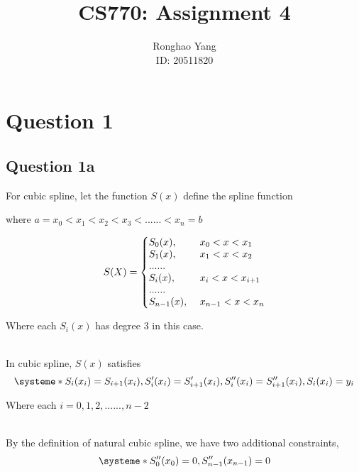 \documentclass[11pt]{article} %
\title{CS770: Assignment 4}
\author{Ronghao Yang\\ID: 20511820}
\begin{document}
\maketitle

\section{Question 1}
\subsection{Question 1a}
For cubic spline, let the function $S(x)$ define the spline function\\\medskip
\centerline{where $a = x_{0} < x_{1} < x_{2} < x_{3} < ......< x_{n} = b$}
 
\begin{equation}
  S(X)=\left\{
  \begin{array}{@{}ll@{}}
    S_{0}(x), & \text{}\ x_{0}<x<x_{1} \\
    S_{1}(x), & \text{}\ x_{1}<x<x_{2}\\
    ......\\
    S_{i}(x), & \text{} \ x_{i}<x<x_{i+1}\\
    ......\\
    S_{n-1}(x), & \text{}\ x_{n-1}<x<x_{n}
  \end{array}\right.
\end{equation} 
\centerline{Where each $S_{i}(x)$ has degree 3 in this case.}\\
In cubic spline, $S(x)$ satisfies
\[
\systeme*{
S_{i}(x_{i})=S_{i+1}(x_{i}),
S_{i}'(x_{i})=S_{i+1}'(x_{i}), 
S_{i}''(x_{i})=S_{i+1}''(x_{i}),
S_{i}(x_{i}) = y_{i}
}
\]
\centerline{Where each $i = 0, 1, 2, ......, n-2$}\\
By the definition of natural cubic spline, we have two additional constraints,
\[
\systeme*{
S_{0}''(x_{0})=0,
S_{n-1}''(x_{n-1})=0
}
\]
\end{document}
